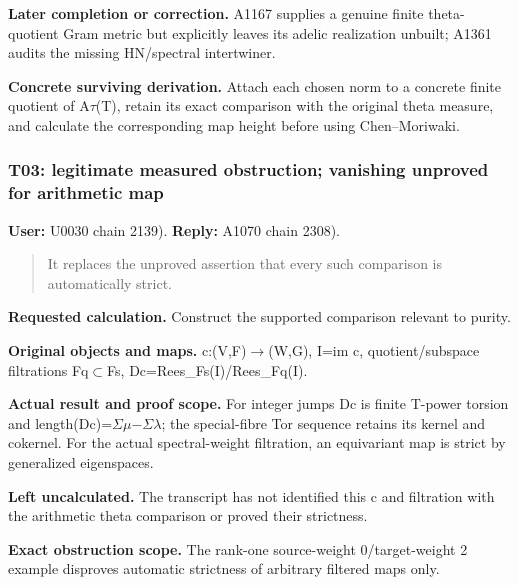\documentclass[10pt,a4paper,oneside]{report}
\begin{document}
\textbf{Later completion or correction.} A1167 supplies a genuine finite
theta-quotient Gram metric but explicitly leaves its adelic realization
unbuilt; A1361 audits the missing HN/spectral intertwiner.

\textbf{Concrete surviving derivation.} Attach each chosen norm to a
concrete finite quotient of
A\allowbreak{}\ensuremath{τ}\allowbreak{}(T), retain its exact
comparison with the original theta measure, and calculate the
corresponding map height before using Chen--Moriwaki.

\subsubsection{T03: legitimate measured obstruction; vanishing unproved
for arithmetic
map}\label{t03-legitimate-measured-obstruction-vanishing-unproved-for-arithmetic-map}

\textbf{User:} U0030
\protect{} chain 2139).
\textbf{Reply:} A1070
\protect{} chain 2308).

\begin{quote}
It replaces the unproved assertion that every such comparison is
automatically strict.
\end{quote}

\textbf{Requested calculation.} Construct the supported comparison
relevant to purity.

\textbf{Original objects and maps.}
c:(V,F)\allowbreak{}\ensuremath{→}\allowbreak{}(W,G), I=im c,
quotient/subspace filtrations
Fq\allowbreak{}\ensuremath{⊂}\allowbreak{}Fs,
Dc=Rees\_Fs(I)/Rees\_Fq(I).

\textbf{Actual result and proof scope.} For integer jumps Dc is finite
T-power torsion and
length(Dc)=\allowbreak{}\ensuremath{Σ}\allowbreak{}\allowbreak{}\ensuremath{μ}\allowbreak{}\allowbreak{}\ensuremath{−}\allowbreak{}\allowbreak{}\ensuremath{Σ}\allowbreak{}\allowbreak{}\ensuremath{λ}\allowbreak{};
the special-fibre Tor sequence retains its kernel and cokernel. For the
actual spectral-weight filtration, an equivariant map is strict by
generalized eigenspaces.

\textbf{Left uncalculated.} The transcript has not identified this c and
filtration with the arithmetic theta comparison or proved their
strictness.

\textbf{Exact obstruction scope.} The rank-one source-weight
0/target-weight 2 example disproves automatic strictness of arbitrary
filtered maps only.
\end{document}
